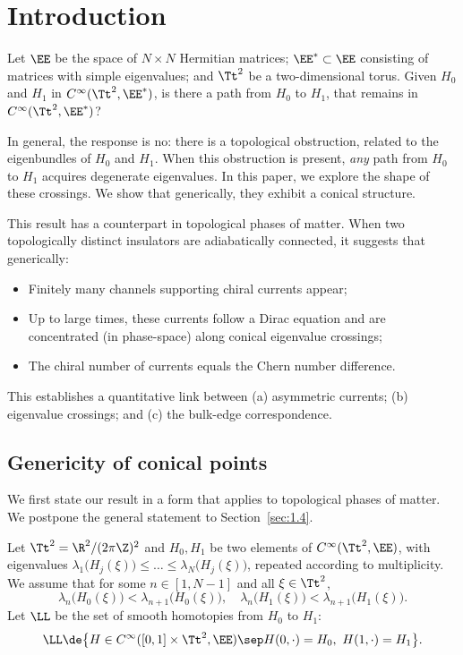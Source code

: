 \section{Introduction}

Let $\EE$ be the space of $N \times N$ Hermitian matrices; $\EE^* \subset \EE$ consisting of matrices with simple eigenvalues; and $\Tt^2$ be a two-dimensional torus. Given $H_0$ and $H_1$ in $C^\infty(\Tt^2,\EE^*)$, is there a path from $H_0$ to $H_1$, that remains in $C^\infty(\Tt^2,\EE^*)$?

In general, the response is no: there is a topological obstruction, related to the eigenbundles of $H_0$ and $H_1$. When this obstruction is present, \textit{any} path from $H_0$ to $H_1$ acquires degenerate eigenvalues. In this paper, we explore the shape of these crossings. We show that generically, they exhibit a conical structure.

This result has a counterpart in topological phases of matter. When two topologically distinct insulators are adiabatically connected, it suggests that generically:
\begin{itemize}
\item Finitely many channels supporting chiral currents appear;
\item Up to large times, these currents follow a Dirac equation and are concentrated (in phase-space) along conical eigenvalue crossings;
\item The chiral number of currents equals the Chern number difference.
\end{itemize}
This establishes a quantitative link between (a) asymmetric currents; (b) eigenvalue crossings; and (c) the bulk-edge correspondence.

\subsection{Genericity of conical points}\label{sec:1.1} We first state our result in a form that applies to topological phases of matter. We postpone the general statement to Section~\ref{sec:1.4}.

Let $\Tt^2 = \R^2/(2\pi\Z)^2$ and $H_0, H_1$ be two elements of $C^\infty(\Tt^2,\EE)$, with eigenvalues $\lambda_1\bigl( H_j(\xi) \bigr) \leq \dots \leq \lambda_N\bigl( H_j(\xi) \bigr)$, repeated according to multiplicity. We assume that for some $n \in [1,N-1]$ and all $\xi \in \Tt^2$,
\begin{equation}\label{eq:1e}
\lambda_n\bigl(H_0(\xi)\bigr) < \lambda_{n+1}\bigl(H_0(\xi)\bigr), \quad \lambda_n\bigl(H_1(\xi)\bigr) < \lambda_{n+1}\bigl(H_1(\xi)\bigr).
\end{equation}
Let $\LL$ be the set of smooth homotopies from $H_0$ to $H_1$:
\begin{equation*}
\LL \de \bigl\{ H \in C^\infty([0,1] \times \Tt^2, \EE)\sep H(0,\cdot) = H_0, \ H(1,\cdot) = H_1\bigr\}.
\end{equation*}

